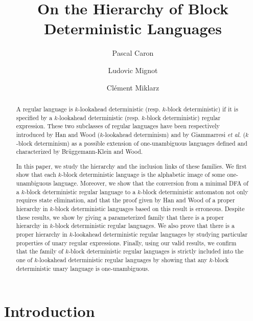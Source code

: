 \documentclass{llncs}
\begin{document}
\title{On the Hierarchy of Block Deterministic Languages}
  
\author{Pascal Caron \and Ludovic Mignot \and Clément Miklarz} 

  
\maketitle

  \begin{abstract}
    A regular language is $k$-lookahead deterministic (resp. $k$-block deterministic) if it is specified by a $k$-lookahead deterministic (resp. $k$-block deterministic) regular expression.
	These two subclasses of regular languages have been respectively introduced by Han and Wood ($k$-lookahead determinism) and by Giammarresi \emph{et al.} ($k$-block determinism) as a possible extension of one-unambiguous languages defined and characterized by Brüggemann-Klein and Wood.

	In this paper, we study the hierarchy and the inclusion links of these families.
	We first show that each $k$-block deterministic language is the alphabetic image of some one-unambiguous language. 
	Moreover, we show that the conversion from a minimal DFA of a $k$-block deterministic regular language to a $k$-block deterministic automaton not only requires state elimination, and that the proof given by Han and Wood of a proper hierarchy in $k$-block deterministic languages based on this result is erroneous.
	Despite these results, we show by giving a parameterized family that there is a proper hierarchy in $k$-block deterministic regular languages. 
	We also prove that there is a proper hierarchy in $k$-lookahead deterministic regular languages by studying particular properties of unary regular expressions.
	Finally, using our valid results, we confirm that the family of $k$-block deterministic regular languages is strictly included into the one of $k$-lookahead deterministic regular languages by showing that any $k$-block deterministic unary language is one-unambiguous.
  \end{abstract} 

\section{Introduction}\label{se:int}
\end{document}
